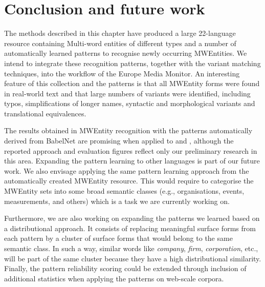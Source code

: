\documentclass[output=paper]{langsci/langscibook}
\begin{document}
\section{Conclusion and future work}
The methods described in this chapter have produced a large 22-language resource containing Multi-word entities of different types and a number of automatically learned patterns to recognise newly occurring MWEntities. We intend to integrate these recognition patterns, together with the variant matching techniques, into the workflow of the Europe Media Monitor. An interesting feature of this collection and the patterns is that all MWEntity forms were found in real-world text and that large numbers of variants were identified, including typos, simplifications of longer names, syntactic and morphological variants and translational equivalences.

The results obtained in MWEntity recognition with the patterns automatically derived from BabelNet are promising when applied to  and , although the reported approach and evaluation figures reflect only our preliminary research in this area. Expanding the pattern learning to other languages is part of our future work. We also envisage applying the same pattern learning approach from the automatically created MWEntity resource. This would require to categorise the MWEntity sets into some broad semantic classes (e.g., organisations, events, measurements, and others) which is a task we are currently working on.

Furthermore, we are also working on expanding the patterns we learned based on a distributional approach. It consists of replacing meaningful surface forms from each pattern by a cluster of surface forms that would belong to the same semantic class. In such a way, similar words like \textit{company}, \textit{firm}, \textit{corporation}, etc., will be part of the same cluster because they have a high distributional similarity. Finally, the pattern reliability scoring could be extended through inclusion of additional statistics when applying the patterns on web-scale corpora.


\printbibliography[heading=subbibliography,notkeyword=this]
\end{document}
